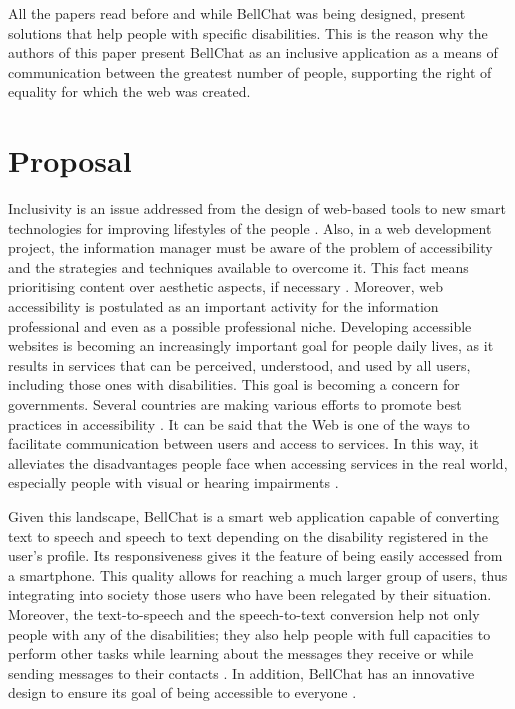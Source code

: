 \documentclass{svproc}
\begin{document}
All the papers read before and while BellChat was being designed, present solutions that help people with specific disabilities. This is the reason why the authors of this paper present BellChat as an inclusive application as a means of communication between the greatest number of people, supporting the right of equality for which the web was created.

\section{Proposal}

Inclusivity is an issue addressed from the design of web-based tools to new smart technologies for improving lifestyles of the people \cite{Meadows2017}. Also, in a web development project, the information manager must be aware of the problem of accessibility and the strategies and techniques available to overcome it. This fact means prioritising content over aesthetic aspects, if necessary \cite{Greco2020}. Moreover, web accessibility is postulated as an important activity for the information professional and even as a possible professional niche. Developing accessible websites is becoming an increasingly important goal for people daily lives, as it results in services that can be perceived, understood, and used by all users, including those ones with disabilities. This goal is becoming a concern for governments. Several countries are making various efforts to promote best practices in accessibility \cite{Broccia2020}. It can be said that the Web is one of the ways to facilitate communication between users and access to services. In this way, it alleviates the disadvantages people face when accessing services in the real world, especially people with visual or hearing impairments \cite{Greco2020}.

Given this landscape, BellChat is a smart web application capable of converting text to speech and speech to text depending on the disability registered in the user's profile. Its responsiveness gives it the feature of being easily accessed from a smartphone. This quality allows for reaching a much larger group of users, thus integrating into society those users who have been relegated by their situation. Moreover, the text-to-speech and the speech-to-text conversion help not only people with any of the disabilities; they also help people with full capacities to perform other tasks while learning about the messages they receive or while sending messages to their contacts \cite{Dwivedi2022}. In addition, BellChat has an innovative design to ensure its goal of being accessible to everyone \cite{Magdalinou2020}.
\end{document}

